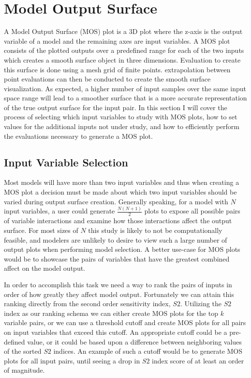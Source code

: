 \section{Model Output Surface\label{sec:out_surf}}
A Model Output Surface (MOS) plot is a 3D plot where the z-axis is the output variable of a model and the remaining axes are input variables. A MOS plot consists of the plotted outputs over a predefined range for each of the two inputs which creates a smooth surface object in three dimensions. Evaluation to create this surface is done using a mesh grid of finite points. extrapolation between point evaluations can then be conducted to create the smooth surface visualization. As expected, a higher number of input samples over the same input space range will lead to a smoother surface that is a more accurate representation of the true output surface for the input pair. In this section I will cover the process of selecting which input variables to study with MOS plots, how to set values for the additional inputs not under study, and how to efficiently perform the evaluations necessary to generate a MOS plot.

\subsection{Input Variable Selection\label{sec:inp_var_sel}}
Most models will have more than two input variables and thus when creating a MOS plot a decision must be made about which two input variables should be varied during output surface creation. Generally speaking, for a model with $N$ input variables, a user could generate $\frac{N(N+1)}{2}$ plots to expose all possible pairs of variable interactions and examine how those interactions affect the output surface. For most sizes of $N$ this study is likely to not be computationally feasible, and modelers are unlikely to desire to view such a large number of output plots when performing model selection. A better use-case for MOS plots would be to showcase the pairs of variables that have the greatest combined affect on the model output.

In order to accomplish this task we need a way to rank the pairs of inputs in order of how greatly they affect model output. Fortunately we can attain this ranking directly from the second order sensitivity index, $S2$. Utilizing the $S2$ index as our ranking schema we can either create MOS plots for the top $k$ variable pairs, or we can use a threshold cutoff and create MOS plots for all pairs on input variables that exceed this cutoff. An appropriate cutoff could be a pre-defined value, or it could be based upon a difference between neighboring values of the sorted $S2$ indices. An example of such a cutoff would be to generate MOS plots for all input pairs, until seeing a drop in $S2$ index score of at least an order of magnitude.

